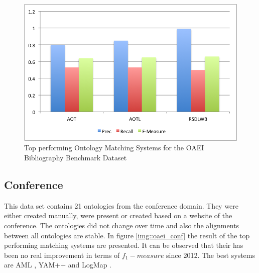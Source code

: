 \documentclass[11pt,titlepage,oneside,openany,a4paper]{report}
\begin{document}
\begin{figure}
 \includegraphics[scale=.5]{figures/oaei/benchmark/top2014.png} 
 \caption{Top performing Ontology Matching Systems for  the OAEI Bibliography Benchmark Dataset}
 \label{img::oaei_anatomy}
\end{figure}

\subsection{Conference}
This data set contains 21 ontologies from the conference domain. They were either created manually, were present or created based on a website of the conference. The ontologies did not change over time and also the alignments between all ontologies are stable. In figure \ref{img::oaei_conf} the result of the top performing matching systems are presented. It can be observed that their has been no real improvement in terms of $f_1-measure$ since 2012. The best systems are AML \cite{Faria:2013aa}, YAM++ \cite{Ngo:2012ab} and LogMap \cite{JimACnez-Ruiz:2011aa}. 
\end{document}
